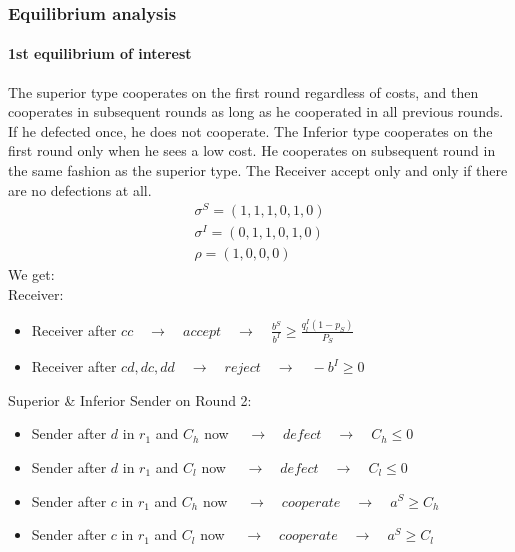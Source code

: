 \documentclass[11pt]{article}
\theoremstyle{plainCl1}
\begin{document}
\subsubsection{Equilibrium analysis}

\paragraph{1st equilibrium of interest}
The superior type cooperates on the first round regardless of costs, and then cooperates in subsequent rounds as long as he cooperated in all previous rounds. If he defected once, he does not cooperate. The Inferior type cooperates on the first round only when he sees a low cost. He cooperates on subsequent round in the same fashion as the superior type. The Receiver accept only and only if there are no defections at all.\\
	\begin{equation}\label{strategies}
	\begin{array}{l}	
	\sigma^S = (1, 1, 1, 0, 1, 0)\\
	\sigma^I = (0, 1, 1, 0, 1, 0)\\
	\rho = (1, 0, 0, 0)
	\end{array}
	\end{equation}
We get:\\
Receiver:
\begin{itemize} [noitemsep]
	\item Receiver after $cc \quad \rightarrow \quad accept \quad \rightarrow \quad \frac{b^S}{b^I}\geq \frac{q^I_l (1-p_S)}{P_S}$\\
	\item Receiver after $cd, dc, dd \quad \rightarrow \quad reject \quad \rightarrow \quad -b^I \geq 0$\\
\end{itemize}
Superior \& Inferior Sender on Round 2:
\begin{itemize} [noitemsep]
	\item Sender after $d$ in $r_1$ and $C_h$ now $\quad \rightarrow \quad defect \quad \rightarrow \quad C_h \leq 0$\\
	\item Sender after $d$ in $r_1$ and $C_l$ now $\quad \rightarrow \quad defect \quad \rightarrow \quad C_l \leq 0$\\
	\item Sender  after $c$ in $r_1$ and $C_h$ now $\quad \rightarrow \quad cooperate \quad \rightarrow \quad a^S \geq C_h$\\
	\item Sender  after $c$ in $r_1$ and $C_l$ now $\quad \rightarrow \quad cooperate \quad \rightarrow \quad a^S \geq C_l$\\
\end{itemize}
\end{document}

